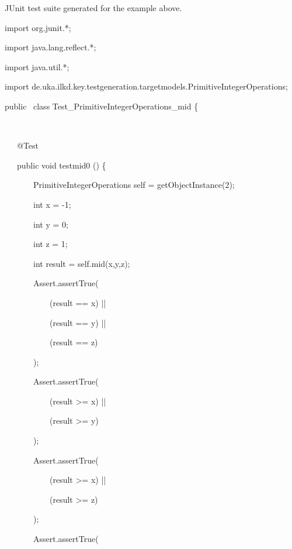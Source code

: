 \documentclass{article}
\newenvironment{tmindent}{\begin{tmparmod}{1.5em}{0pt}{0pt} }{\end{tmparmod}}
\newenvironment{tmparmod}[3]{\begin{list}{}{\setlength{\topsep}{0pt}\setlength{\leftmargin}{#1}\setlength{\rightmargin}{#2}\setlength{\parindent}{#3}\setlength{\listparindent}{\parindent}\setlength{\itemindent}{\parindent}\setlength{\parsep}{\parskip}} \item[]}{\end{list}}
\newenvironment{tmparsep}[1]{\begingroup\setlength{\parskip}{#1}}{\endgroup}
\begin{document}
\begin{example}
  JUnit test suite generated for the example above.
  
  {\noindent}\begin{tmindent}
    \begin{tmparsep}{0em}
      import org.junit.*;
      
      import java.lang.reflect.*;
      
      import java.util.*;
      
      import
      de.uka.ilkd.key.testgeneration.targetmodels.PrimitiveIntegerOperations;
      
      
      
      public \ class Test\_PrimitiveIntegerOperations\_mid \{
      
      \ \ \
      
      \ \ \ @Test
      
      \ \ \ public void testmid0 () \{
      
      \ \ \ \ \ \ \ PrimitiveIntegerOperations self = getObjectInstance(2);
      
      \ \ \ \ \ \ \ int x = -1;
      
      \ \ \ \ \ \ \ int y = 0;
      
      \ \ \ \ \ \ \ int z = 1;
      
      \ \ \ \ \ \ \ int result = self.mid(x,y,z);
      
      \ \ \ \ \ \ \ Assert.assertTrue(
      
      \ \ \ \ \ \ \ \ \ \ \ (result == x) ||
      
      \ \ \ \ \ \ \ \ \ \ \ (result == y) ||
      
      \ \ \ \ \ \ \ \ \ \ \ (result == z)
      
      \ \ \ \ \ \ \ );
      
      \ \ \ \ \ \ \ Assert.assertTrue(
      
      \ \ \ \ \ \ \ \ \ \ \ (result >= x) ||
      
      \ \ \ \ \ \ \ \ \ \ \ (result >= y)
      
      \ \ \ \ \ \ \ );
      
      \ \ \ \ \ \ \ Assert.assertTrue(
      
      \ \ \ \ \ \ \ \ \ \ \ (result >= x) ||
      
      \ \ \ \ \ \ \ \ \ \ \ (result >= z)
      
      \ \ \ \ \ \ \ );
      
      \ \ \ \ \ \ \ Assert.assertTrue(
      

\end{tmparsep}
\end{tmindent}
\end{example}
\end{document}
